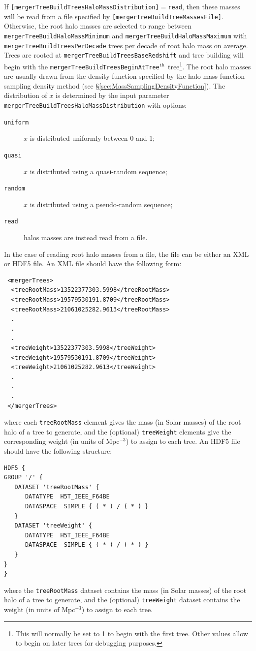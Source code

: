 If {\tt [mergerTreeBuildTreesHaloMassDistribution]}$=${\tt read}, then these masses will be read from a file specified by {\tt [mergerTreeBuildTreeMassesFile]}. Otherwise, the root halo masses are selected to range between {\tt mergerTreeBuildHaloMassMinimum} and {\tt mergerTreeBuildHaloMassMaximum} with {\tt mergerTreeBuildTreesPerDecade} trees per decade of root halo mass on average. Trees are rooted at {\tt mergerTreeBuildTreesBaseRedshift} and tree building will begin with the {\tt mergerTreeBuildTreesBeginAtTree}$^{\rm th}$ tree\footnote{This will normally be set to 1 to begin with the first tree. Other values allow to begin on later trees for debugging purposes.}. The root halo masses are usually drawn from the density function specified by the halo mass function sampling density method (see \S\ref{sec:MassSamplingDensityFunction}). The distribution of $x$ is determined by the input parameter {\tt mergerTreeBuildTreesHaloMassDistribution} with options:
\begin{description}
 \item [{\tt uniform}] $x$ is distributed uniformly between 0 and 1;
 \item [{\tt quasi}] $x$ is distributed using a quasi-random sequence;
 \item [{\tt random}] $x$ is distributed using a pseudo-random sequence;
 \item [{\tt read}] halos masses are instead read from a file.
\end{description}

In the case of reading root halo masses from a file, the file can be either an XML or HDF5 file. An XML file should have the following form:
\begin{verbatim}
 <mergerTrees>
  <treeRootMass>13522377303.5998</treeRootMass>
  <treeRootMass>19579530191.8709</treeRootMass>
  <treeRootMass>21061025282.9613</treeRootMass>
  .
  .
  .
  <treeWeight>13522377303.5998</treeWeight>
  <treeWeight>19579530191.8709</treeWeight>
  <treeWeight>21061025282.9613</treeWeight>
  .
  .
  .
 </mergerTrees>
\end{verbatim}
where each {\tt treeRootMass} element gives the mass (in Solar masses) of the root halo of a tree to generate, and the (optional) {\tt treeWeight} elements give the corresponding weight (in units of Mpc$^{-3}$) to assign to each tree. An HDF5 file should have the following structure:
\begin{verbatim}
HDF5 {
GROUP '/' {
   DATASET 'treeRootMass' {
      DATATYPE  H5T_IEEE_F64BE
      DATASPACE  SIMPLE { ( * ) / ( * ) }
   }
   DATASET 'treeWeight' {
      DATATYPE  H5T_IEEE_F64BE
      DATASPACE  SIMPLE { ( * ) / ( * ) }
   }
}
}
\end{verbatim}
where the {\tt treeRootMass} dataset contains the mass (in Solar masses) of the root halo of a tree to generate, and the (optional) {\tt treeWeight} dataset contains the weight (in units of Mpc$^{-3}$) to assign to each tree.

